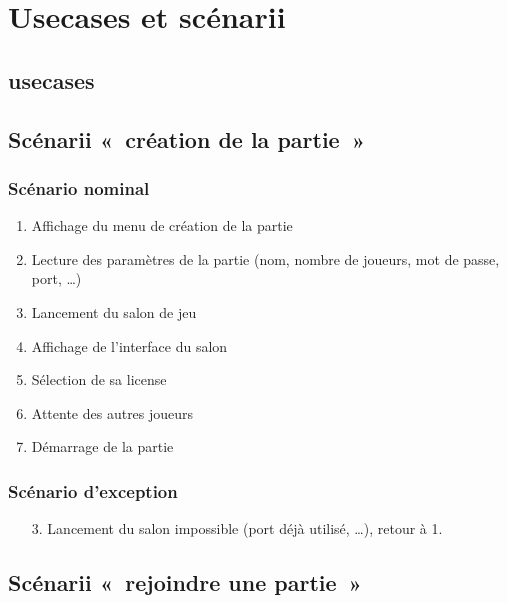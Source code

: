 \chapter{Usecases et scénarii}\label{chapter:usecases-and-scenarii}

\section{usecases}



\section{Scénarii « création de la partie »}

\subsection{Scénario nominal}
\begin{enumerate}
    \item Affichage du menu de création de la partie
    \item Lecture des paramètres de la partie (nom, nombre de joueurs, mot de passe, port, \ldots)
    \item Lancement du salon de jeu
    \item Affichage de l'interface du salon
    \item Sélection de sa license
    \item Attente des autres joueurs
    \item Démarrage de la partie
\end{enumerate}

\subsection{Scénario d'exception}

\begin{itemize}
    \item[3.] Lancement du salon impossible (port déjà utilisé, \ldots), retour à 1.
\end{itemize}

\section{Scénarii « rejoindre une partie »}

